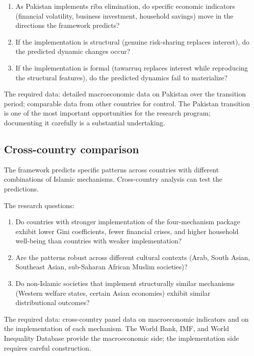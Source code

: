 \begin{enumerate}[leftmargin=2em]
    \item As Pakistan implements riba elimination, do specific
    economic indicators (financial volatility, business
    investment, household savings) move in the directions the
    framework predicts?
    \item If the implementation is structural (genuine
    risk-sharing replaces interest), do the predicted dynamic
    changes occur?
    \item If the implementation is formal (tawarruq replaces
    interest while reproducing the structural features), do the
    predicted dynamics fail to materialize?
\end{enumerate}

The required data: detailed macroeconomic data on Pakistan over
the transition period; comparable data from other countries for
control. The Pakistan transition is one of the most important
opportunities for the research program; documenting it carefully
is a substantial undertaking.

\subsection{Cross-country comparison}

The framework predicts specific patterns across countries with
different combinations of Islamic mechanisms. Cross-country
analysis can test the predictions.

The research questions:

\begin{enumerate}[leftmargin=2em]
    \item Do countries with stronger implementation of the
    four-mechanism package exhibit lower Gini coefficients,
    fewer financial crises, and higher household well-being than
    countries with weaker implementation?
    \item Are the patterns robust across different cultural
    contexts (Arab, South Asian, Southeast Asian, sub-Saharan
    African Muslim societies)?
    \item Do non-Islamic societies that implement structurally
    similar mechanisms (Western welfare states, certain Asian
    economies) exhibit similar distributional outcomes?
\end{enumerate}

The required data: cross-country panel data on macroeconomic
indicators and on the implementation of each mechanism. The
World Bank, IMF, and World Inequality Database provide the
macroeconomic side; the implementation side requires careful
construction.


